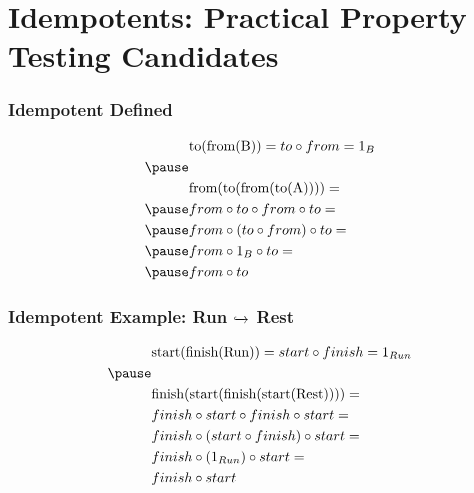 \documentclass{beamer}
\begin{document}
\section{Idempotents: Practical Property Testing Candidates}
\begin{frame}[fragile]
\frametitle{Idempotent Defined}
\medskip
\begin{equation*}
\begin{aligned}
& \text{to(from(B))} = to \circ from = 1_B \\ \pause
& \\
& \text{from(to(from(to(A))))} = \\ \pause
& from \circ to \circ from \circ to = \\ \pause
& from \circ (to \circ from) \circ to = \\ \pause
& from \circ 1_B \circ to = \\ \pause
& from \circ to \\
\end{aligned}
\end{equation*}
\end{frame}

\begin{frame}[fragile]
\frametitle{Idempotent Example: Run {$\xhookrightarrow{}$} Rest}
\medskip
\begin{equation*}
\begin{aligned}
& \text{start(finish(Run))} = start \circ finish = 1_{Run} \\ \pause
& \\
& \text{finish(start(finish(start(Rest))))} = \\
& finish \circ start \circ finish \circ start = \\
& finish \circ (start \circ finish) \circ start = \\
& finish \circ (1_{Run}) \circ start = \\
& finish \circ start \\
\end{aligned}
\end{equation*}
\end{frame}
\end{document}
